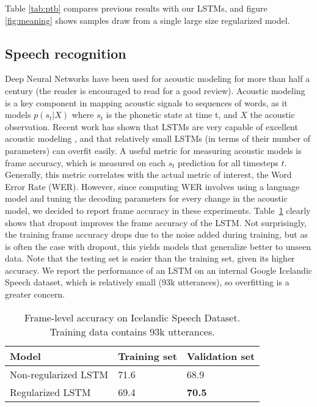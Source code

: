\documentclass{article}
\begin{document}
Table \ref{tab:ptb} compares previous results with our LSTMs, and
figure \ref{fig:meaning} shows samples draw from a single large size
regularized model.



\subsection{Speech recognition}
\label{sec:speech}

Deep Neural Networks have been used for acoustic modeling for more
than half a century (the reader is encouraged to read
\citet{BourlardASR} for a good review). Acoustic modeling is a key
component in mapping acoustic signals to sequences of words, as it
models $p(s_t|X)$ where $s_t$ is the phonetic state at time t, and $X$
the acoustic observation. Recent work has shown that LSTMs are very
capable of excellent acoustic modeling \cite{sak2014speech}, and that
relatively small LSTMs (in terms of their number of parameters) can
overfit easily. A useful metric for measuring acoustic models is frame
accuracy, which is measured on each $s_t$ prediction for all timesteps
$t$. Generally, this metric correlates with the actual metric of
interest, the Word Error Rate (WER). However, since computing WER
involves using a language model and tuning the decoding parameters for
every change in the acoustic model, we decided to report frame
accuracy in these experiments. Table~\ref{tab:speech} clearly shows
that dropout improves the frame accuracy of the LSTM. Not
surprisingly, the training frame accuracy drops due to the noise added
during training, but as is often the case with dropout, this yields
models that generalize better to unseen data. Note that the testing
set is easier than the training set, given its higher accuracy.  We
report the performance of an LSTM on an internal Google Icelandic
Speech dataset, which is relatively small (93k utterances), so
overfitting is a greater concern.

\begin{table}[t]
  \small
  \centering
  \renewcommand{\arraystretch}{1.15}
  \begin{tabular}{lll}
    \hline
     Model & Training set & Validation set \\
    \hline
    Non-regularized LSTM & 71.6 & 68.9 \\
    Regularized LSTM & 69.4 & {\bf 70.5} \\
    \hline
  \end{tabular}
  \caption{Frame-level accuracy on Icelandic Speech Dataset. Training data contains 93k utterances.}
  \label{tab:speech}
\end{table}
\end{document}
